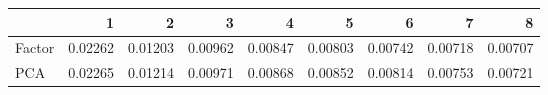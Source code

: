 \begin{table}[t]
\centering

\begin{tabular}{lrrrrrrrr}
\toprule
  & 1 & 2 & 3 & 4 & 5 & 6 & 7 & 8\\
\midrule
Factor & 0.02262 & 0.01203 & 0.00962 & 0.00847 & 0.00803 & 0.00742 & 0.00718 & 0.00707\\
PCA & 0.02265 & 0.01214 & 0.00971 & 0.00868 & 0.00852 & 0.00814 & 0.00753 & 0.00721\\
\bottomrule
\end{tabular}
\end{table}
